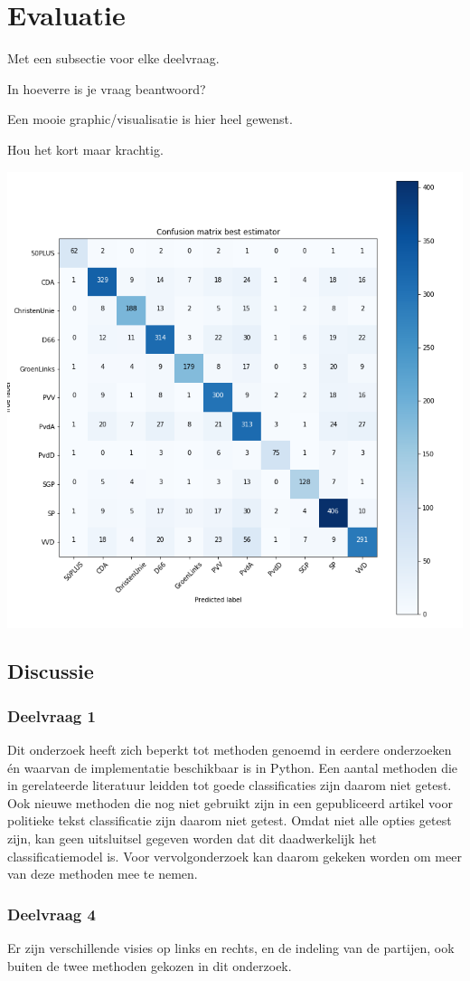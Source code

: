 \section{Evaluatie}
\label{sec:eva}

Met een subsectie voor elke deelvraag.

In hoeverre is je vraag beantwoord?

Een mooie graphic/visualisatie is hier heel gewenst.

Hou het kort maar krachtig.


\includegraphics[width=0.6\paperwidth]{Verslag/confusionmatrix.png}

\subsection{Discussie}
\subsubsection{Deelvraag 1}
Dit onderzoek heeft zich beperkt tot methoden genoemd in eerdere onderzoeken én waarvan de implementatie beschikbaar is in Python. Een aantal methoden die in gerelateerde literatuur leidden tot goede classificaties zijn daarom niet getest. Ook nieuwe methoden die nog niet gebruikt zijn in een gepubliceerd artikel voor politieke tekst classificatie zijn daarom niet getest. Omdat niet alle opties getest zijn, kan geen uitsluitsel gegeven worden dat dit daadwerkelijk het classificatiemodel is. Voor vervolgonderzoek kan daarom gekeken worden om meer van deze methoden mee te nemen.\par

\subsubsection{Deelvraag 4}
Er zijn verschillende visies op links en rechts, en de indeling van de partijen, ook buiten de twee methoden gekozen in dit onderzoek.\par